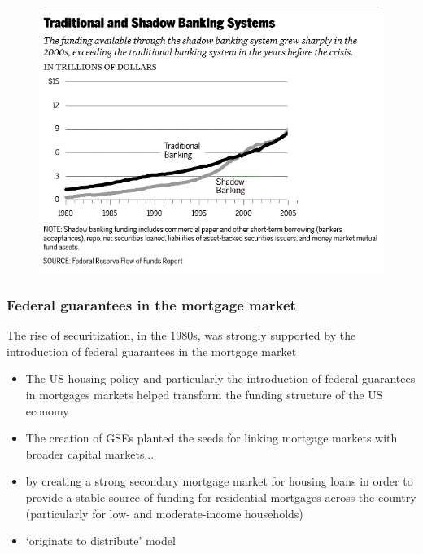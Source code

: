 \documentclass[11pt]{beamer}
\begin{document}
\begin{frame}
\begin{figure}
\includegraphics[width=1 \textwidth]{SB1.png}
\end{figure}
\end{frame}

\begin{frame}
\frametitle{Federal guarantees in the mortgage market}
The rise of securitization, in the 1980s, was strongly supported by the introduction of federal guarantees in the mortgage market
\begin{itemize}
\item The US housing policy and particularly the introduction of
federal guarantees in mortgages markets helped transform
the funding structure of the US economy
\item The creation of GSEs planted the seeds for linking mortgage markets with broader capital markets...
\item by creating a strong secondary mortgage market for housing loans in order to  provide a stable source of funding for residential mortgages across the country (particularly for low- and moderate-income households)
\item  ‘originate to distribute’ model

\end{itemize}

\end{frame}

\end{document}
